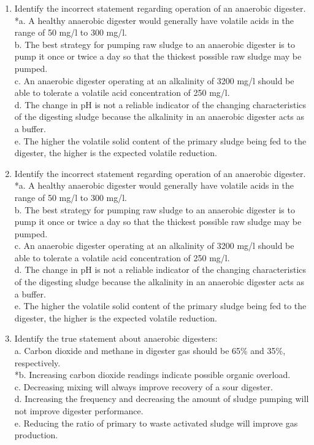 \documentclass{article}
\begin{document}
\begin{enumerate}
\item  Identify the incorrect statement regarding operation of an anaerobic digester. \\

*a. A healthy anaerobic digester would generally have volatile acids in the range of 50 mg/l to 300 mg/l. \\
b. The best strategy for pumping raw sludge to an anaerobic digester is to pump it once or twice a day so that the thickest possible raw sludge may be pumped. \\
c. An anaerobic digester operating at an alkalinity of 3200 mg/l should be able to tolerate a volatile acid concentration of 250 mg/l. \\
d. The change in pH is not a reliable indicator of the changing characteristics of the digesting sludge because the alkalinity in an anaerobic digester acts as a buffer. \\
e. The higher the volatile solid content of the primary sludge being fed to the digester, the higher is the expected volatile reduction. \\

\item  Identify the incorrect statement regarding operation of an anaerobic digester. \\

*a. A healthy anaerobic digester would generally have volatile acids in the range of 50 mg/l to 300 mg/l. \\
b. The best strategy for pumping raw sludge to an anaerobic digester is to pump it once or twice a day so that the thickest possible raw sludge may be pumped. \\
c. An anaerobic digester operating at an alkalinity of 3200 mg/l should be able to tolerate a volatile acid concentration of 250 mg/l. \\
d. The change in pH is not a reliable indicator of the changing characteristics of the digesting sludge because the alkalinity in an anaerobic digester acts as a buffer. \\
e. The higher the volatile solid content of the primary sludge being fed to the digester, the higher is the expected volatile reduction. \\

\item  Identify the true statement about anaerobic digesters: \\

a. Carbon dioxide and methane in digester gas should be 65\% and 35\%, respectively. \\
*b. Increasing carbon dioxide readings indicate possible organic overload. \\
c. Decreasing mixing will always improve recovery of a sour digester. \\
d. Increasing the frequency and decreasing the amount of sludge pumping will not improve digester performance. \\
e. Reducing the ratio of primary to waste activated sludge will improve gas production. \\


\end{enumerate}
\end{document}

